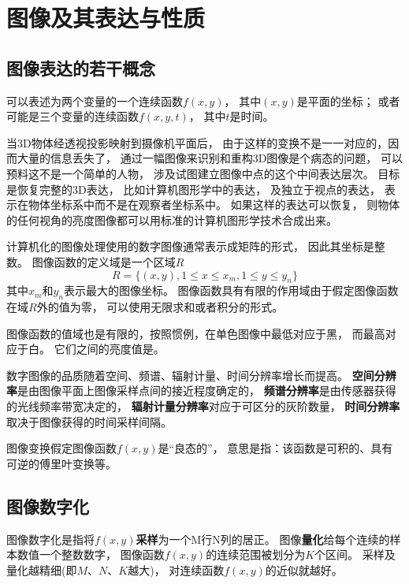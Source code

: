 \chapter{图像及其表达与性质}
\section{图像表达的若干概念}
{\textbf{\color{magenta}{图像}}}可以表述为两个变量的一个连续函数$f(x,y)$，%
其中$(x,y)$是平面的坐标；%
或者可能是三个变量的连续函数$f(x,y,t)$，%
其中$t$是时间。

当3D物体经透视投影映射到摄像机平面后，%
由于这样的变换不是一一对应的，因而大量的信息丢失了，%
通过一幅图像来识别和重构3D图像是个病态的问题，%
可以预料这不是一个简单的人物，%
涉及试图建立图像中点的{\textbf{\color{magenta}{深度}}}这个中间表达层次。%
目标是恢复完整的3D表达，%
比如计算机图形学中的表达，%
及独立于视点的表达，%
表示在物体坐标系中而不是在观察者坐标系中。%
如果这样的表达可以恢复，%
则物体的任何视角的亮度图像都可以用标准的计算机图形学技术合成出来。

计算机化的图像处理使用的数字图像通常表示成矩阵的形式，%
因此其坐标是整数。%
图像函数的定义域是一个区域$R$
\begin{equation}
  R = \{(x,y), 1\leq{}x{}\leq{}x_{m}, 1\leq{}y{}\leq{}y_{n}\}
\end{equation}
其中$x_{m}$和$y_{n}$表示最大的图像坐标。%
图像函数具有有限的作用域\dash{}由于假定图像函数在域$R$外的值为零，%
可以使用无限求和或者积分的形式。%

图像函数的值域也是有限的，按照惯例，在单色图像中最低对应于黑，%
而最高对应于白。%
它们之间的亮度值是{\textbf{\color{magenta}{灰阶}}}。

数字图像的品质随着空间、频谱、辐射计量、时间分辨率增长而提高。%
{\textbf{\color{magenta}空间分辨率}}是由图像平面上图像采样点间的接近程度确定的，%
{\textbf{\color{magenta}频谱分辨率}}是由传感器获得的光线频率带宽决定的，%
{\textbf{\color{magenta}辐射计量分辨率}}对应于可区分的灰阶数量，%
{\textbf{\color{magenta}时间分辨率}}取决于图像获得的时间采样间隔。

图像变换假定图像函数$f(x,y)$是“良态的”，%
意思是指：该函数是可积的、具有可逆的傅里叶变换等。





\section{图像数字化}
图像数字化是指将$f(x,y)${\textbf{\color{magenta}采样}}为一个M行N列的居正。%
图像{\textbf{\color{magenta}量化}}给每个连续的样本数值一个整数数字，%
图像函数$f(x,y)$的连续范围被划分为$K$个区间。%
采样及量化越精细(即$M$、$N$、$K$越大)，%
对连续函数$f(x,y)$的近似就越好。

